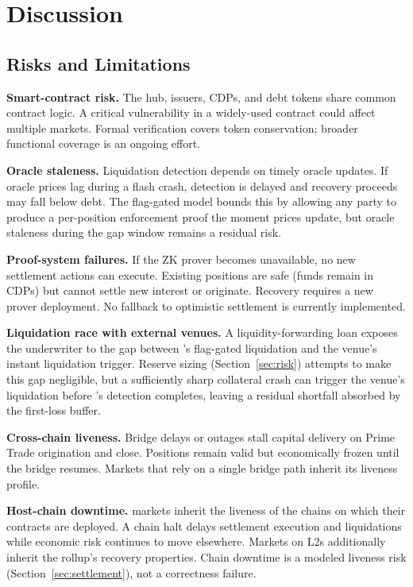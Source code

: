 \section{Discussion}
\label{sec:discussion}

\subsection{Risks and Limitations}

\textbf{Smart-contract risk.} The hub, issuers, CDPs, and debt tokens share common contract logic. A critical vulnerability in a widely-used contract could affect multiple markets. Formal verification covers token conservation; broader functional coverage is an ongoing effort.

\textbf{Oracle staleness.} Liquidation detection depends on timely oracle updates. If oracle prices lag during a flash crash, detection is delayed and recovery proceeds may fall below debt. The flag-gated model bounds this by allowing any party to produce a per-position enforcement proof the moment prices update, but oracle staleness during the gap window remains a residual risk.

\textbf{Proof-system failures.} If the ZK prover becomes unavailable, no new settlement actions can execute. Existing positions are safe (funds remain in CDPs) but cannot settle new interest or originate. Recovery requires a new prover deployment. No fallback to optimistic settlement is currently implemented.

\textbf{Liquidation race with external venues.} A liquidity-forwarding loan exposes the underwriter to the gap between \daloc{}'s flag-gated liquidation and the venue's instant liquidation trigger. Reserve sizing (Section~\ref{sec:risk}) attempts to make this gap negligible, but a sufficiently sharp collateral crash can trigger the venue's liquidation before \daloc{}'s detection completes, leaving a residual shortfall absorbed by the first-loss buffer.

\textbf{Cross-chain liveness.} Bridge delays or outages stall capital delivery on Prime Trade origination and close. Positions remain valid but economically frozen until the bridge resumes. Markets that rely on a single bridge path inherit its liveness profile.

\textbf{Host-chain downtime.} \daloc{} markets inherit the liveness of the chains on which their contracts are deployed. A chain halt delays settlement execution and liquidations while economic risk continues to move elsewhere. Markets on L2s additionally inherit the rollup's recovery properties. Chain downtime is a modeled liveness risk (Section~\ref{sec:settlement}), not a correctness failure.

